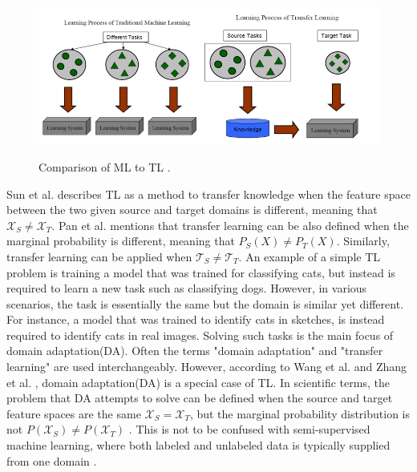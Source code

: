  
\begin{figure}[htb]
	\begin{center}
		\includegraphics[width=16cm]{./TL.png}
	\end{center}
	\caption{Comparison of ML to TL \cite{Pan2010}.}
	\begin{center}
		\label{TL}
	\end{center}
\end{figure}
\FloatBarrier

Sun et al. \cite{SUN201584} describes TL as a method to transfer knowledge when the feature space between the two given source and target domains is different, meaning that $\mathcal{X}_{S} \neq \mathcal{X}_{T}$. Pan et al. \cite{Pan2010} mentions that transfer learning can be also defined when the marginal probability is different, meaning that $P_{S}(X) \neq P_{T}(X)$. Similarly, transfer learning can be applied when $\mathcal{T}_{S} \neq \mathcal{T}_{T}$. An example of a simple TL problem is training a model that was trained for classifying cats, but instead is  required to learn a new task such as classifying dogs. However, in various scenarios, the task is essentially the same but the domain is similar yet different. For instance, a model that was trained to identify cats in sketches, is instead required to identify cats in real images. Solving such tasks is the main focus of domain adaptation(DA). Often the terms "domain adaptation" and "transfer learning" are used interchangeably. However, according to Wang et al. \cite{Wang2018} and Zhang et al. \cite{Zhang2021}, domain adaptation(DA) is a special case of TL. In scientific terms, the problem that DA attempts to solve can be defined when the source and target feature spaces are the same $\mathcal{X}_{S}=\mathcal{X}_{T}$, but the marginal probability distribution is not $P\left(\mathcal{X}_{S}\right) \neq P\left(\mathcal{X}_{T}\right)$ \cite{SUN201584}. This is not to be confused with semi-supervised machine learning, where both labeled and unlabeled data is typically supplied from one domain \cite{SUN201584}. 

